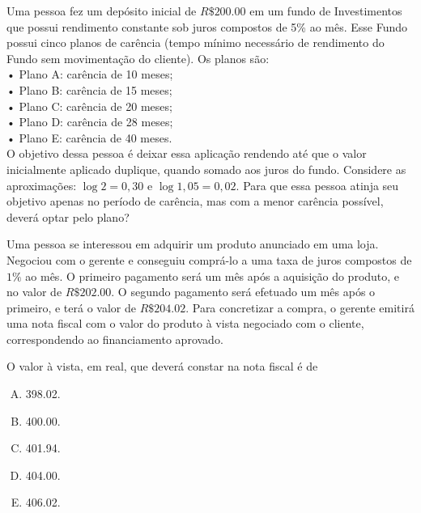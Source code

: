 \documentclass{book}
\theoremstyle{definition}
\theoremstyle{remark}
\theoremstyle{plain}
\theoremstyle{plain}
\theoremstyle{plain}
\theoremstyle{plain}
\begin{document}
        \begin{Exercise}[origin={ENEM 2019, adaptado}]
            Uma pessoa fez um depósito inicial de $R\$ \num{200.00}$ em um fundo de Investimentos que possui 
            rendimento constante sob juros compostos de 5\% ao mês. Esse Fundo possui cinco planos de carência 
            (tempo mínimo necessário de rendimento do Fundo sem movimentação do cliente). Os planos são: \\
            • Plano A: carência de 10 meses;  \\
            • Plano B: carência de 15 meses;  \\
            • Plano C: carência de 20 meses;  \\
            • Plano D: carência de 28 meses;  \\
            • Plano E: carência de 40 meses.  \\
            O objetivo dessa pessoa é deixar essa aplicação rendendo até que o valor inicialmente aplicado duplique, 
            quando somado aos juros do fundo. Considere as aproximações: $\log 2 = 0,30$ e $\log 1,05 = 0,02$.
            Para que essa pessoa atinja seu objetivo apenas no período de carência, mas com a menor 
                carência possível, deverá optar pelo plano?
        \end{Exercise}
        \begin{Exercise}[origin={ENEM 2019, adaptado}]
            Uma pessoa se interessou em adquirir um produto anunciado em uma loja. Negociou com o gerente e
            conseguiu comprá-lo a uma taxa de juros compostos de $1\%$ ao mês. O primeiro pagamento será 
            um mês após a aquisição do produto, e no valor de $R\$ \num{202.00}$. O segundo pagamento será 
            efetuado um mês após o primeiro, e terá o valor de $R\$ \num{204.02}$. Para concretizar a 
            compra, o gerente emitirá uma nota fiscal com o valor do produto à vista negociado com o cliente,
            correspondendo ao financiamento aprovado.

            O valor à vista, em real, que deverá constar na nota fiscal é de
            \begin{enumerate}[A)]
                \item \num{398.02}.
                \item \num{400.00}.
                \item \num{401.94}.
                \item \num{404.00}.
                \item \num{406.02}.
            \end{enumerate}
        \end{Exercise}
\end{document}
